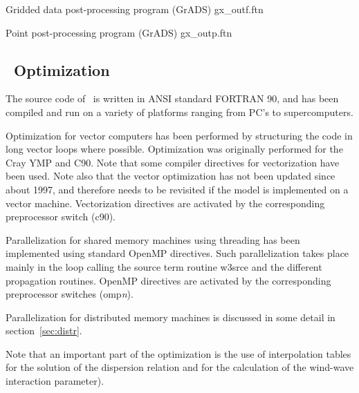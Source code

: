 \noindent
Gridded data post-processing program (GrADS) \hfill {\file gx\_outf.ftn}

\begin{flisti}
\end{flisti}

\noindent
Point post-processing program (GrADS) \hfill {\file gx\_outp.ftn}

\begin{flisti}
\end{flisti}




\subsection{~Optimization} \label{sec:optim}
\vssub

The source code of \ws\ is written in ANSI standard FORTRAN 90, and has been
compiled and run on a variety of platforms ranging from PC's to
supercomputers.

Optimization for vector computers has been performed by structuring the code
in long vector loops where possible. Optimization was originally performed for
the Cray YMP and C90. Note that some compiler directives for vectorization
have been used. Note also that the vector optimization has not been updated
since about 1997, and therefore needs to be revisited if the model is
implemented on a vector machine. Vectorization directives are activated by the
corresponding preprocessor switch ({\F c90}).

Parallelization for shared memory machines using threading has been
implemented using standard OpenMP directives. Such parallelization takes place
mainly in the loop calling the source term routine {\F w3srce} and the
different propagation routines. OpenMP directives are activated by the
corresponding preprocessor switches ({\F omp}{\it n}).

Parallelization for distributed memory machines is discussed in some detail in
section~\ref{sec:distr}.

Note that an important part of the optimization is the use of interpolation
tables for the solution of the dispersion relation and for the calculation of
the wind-wave interaction parameter).


